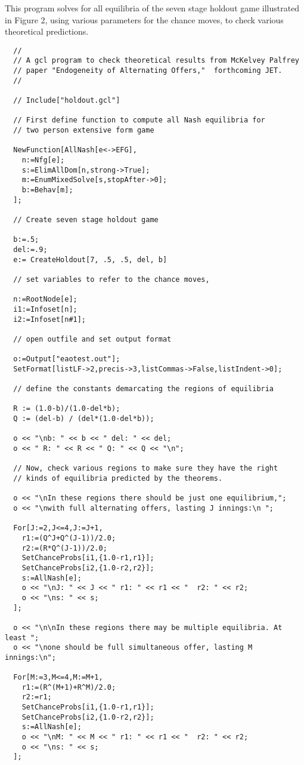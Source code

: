 \noindent
This program solves for all equilibria of the seven stage holdout game
illustrated in Figure 2, using various parameters for the chance
moves, to check various theoretical predictions. 
{\scriptsize
\begin{verbatim}
  //
  // A gcl program to check theoretical results from McKelvey Palfrey 
  // paper "Endogeneity of Alternating Offers,"  forthcoming JET.  
  //

  // Include["holdout.gcl"]

  // First define function to compute all Nash equilibria for 
  // two person extensive form game

  NewFunction[AllNash[e<->EFG],
    n:=Nfg[e];
    s:=ElimAllDom[n,strong->True];
    m:=EnumMixedSolve[s,stopAfter->0];
    b:=Behav[m];
  ];

  // Create seven stage holdout game

  b:=.5;
  del:=.9;
  e:= CreateHoldout[7, .5, .5, del, b]

  // set variables to refer to the chance moves, 

  n:=RootNode[e];
  i1:=Infoset[n];
  i2:=Infoset[n#1];

  // open outfile and set output format

  o:=Output["eaotest.out"];
  SetFormat[listLF->2,precis->3,listCommas->False,listIndent->0];

  // define the constants demarcating the regions of equilibria

  R := (1.0-b)/(1.0-del*b);
  Q := (del-b) / (del*(1.0-del*b));

  o << "\nb: " << b << " del: " << del;
  o << " R: " << R << " Q: " << Q << "\n";

  // Now, check various regions to make sure they have the right 
  // kinds of equilibria predicted by the theorems.  

  o << "\nIn these regions there should be just one equilibrium,";
  o << "\nwith full alternating offers, lasting J innings:\n ";

  For[J:=2,J<=4,J:=J+1,
    r1:=(Q^J+Q^(J-1))/2.0;
    r2:=(R*Q^(J-1))/2.0;
    SetChanceProbs[i1,{1.0-r1,r1}];
    SetChanceProbs[i2,{1.0-r2,r2}];
    s:=AllNash[e];
    o << "\nJ: " << J << " r1: " << r1 << "  r2: " << r2;
    o << "\ns: " << s;
  ];

  o << "\n\nIn these regions there may be multiple equilibria. At least ";
  o << "\none should be full simultaneous offer, lasting M innings:\n";

  For[M:=3,M<=4,M:=M+1,
    r1:=(R^(M+1)+R^M)/2.0;
    r2:=r1;
    SetChanceProbs[i1,{1.0-r1,r1}];
    SetChanceProbs[i2,{1.0-r2,r2}];
    s:=AllNash[e];
    o << "\nM: " << M << " r1: " << r1 << "  r2: " << r2;
    o << "\ns: " << s;
  ];
\end{verbatim}
}

